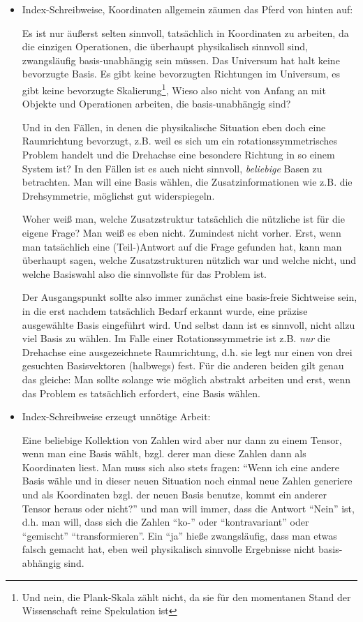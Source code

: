 \begin{remark}
\begin{itemize}
\item Index-Schreibweise, Koordinaten allgemein zäumen das Pferd von hinten auf:

Es ist nur äußerst selten sinnvoll, tatsächlich in Koordinaten zu arbeiten, da die einzigen Operationen, die überhaupt physikalisch sinnvoll sind, zwangsläufig basis-unabhängig sein müssen. Das Universum hat halt keine bevorzugte Basis. Es gibt keine bevorzugten Richtungen im Universum, es gibt keine bevorzugte Skalierung\footnote{Und nein, die Plank-Skala zählt nicht, da sie für den momentanen Stand der Wissenschaft reine Spekulation ist}, Wieso also nicht von Anfang an mit Objekte und Operationen arbeiten, die basis-unabhängig sind?

Und in den Fällen, in denen die physikalische Situation eben doch eine Raumrichtung bevorzugt, z.B. weil es sich um ein rotationssymmetrisches Problem handelt und die Drehachse eine besondere Richtung in so einem System ist? In den Fällen ist es auch nicht sinnvoll, \emph{beliebige} Basen zu betrachten. Man will eine Basis wählen, die Zusatzinformationen wie z.B. die Drehsymmetrie, möglichst gut widerspiegeln.

Woher weiß man, welche Zusatzstruktur tatsächlich die nützliche ist für die eigene Frage? Man weiß es eben nicht. Zumindest nicht vorher. Erst, wenn man tatsächlich eine (Teil-)Antwort auf die Frage gefunden hat, kann man überhaupt sagen, welche Zusatzstrukturen nützlich war und welche nicht, und welche Basiswahl also die sinnvollste für das Problem ist.

Der Ausgangspunkt sollte also immer zunächst eine basis-freie Sichtweise sein, in die erst nachdem tatsächlich Bedarf erkannt wurde, eine präzise ausgewählte Basis eingeführt wird. Und selbst dann ist es sinnvoll, nicht allzu viel Basis zu wählen. Im Falle einer Rotationssymmetrie ist z.B. \emph{nur} die Drehachse eine ausgezeichnete Raumrichtung, d.h. sie legt nur einen von drei gesuchten Basisvektoren (halbwegs) fest. Für die anderen beiden gilt genau das gleiche: Man sollte solange wie möglich abstrakt arbeiten und erst, wenn das Problem es tatsächlich erfordert, eine Basis wählen.

\item Index-Schreibweise erzeugt unnötige Arbeit:

Eine beliebige Kollektion von Zahlen wird aber nur dann zu einem Tensor, wenn man eine Basis wählt, bzgl. derer man diese Zahlen dann als Koordinaten liest. Man muss sich also stets fragen: \enquote{Wenn ich eine andere Basis wähle und in dieser neuen Situation noch einmal neue Zahlen generiere und als Koordinaten bzgl. der neuen Basis benutze, kommt ein anderer Tensor heraus oder nicht?} und man will immer, dass die Antwort \enquote{Nein} ist, d.h. man will, dass sich die Zahlen \enquote{ko-} oder \enquote{kontravariant} oder \enquote{gemischt} \enquote{transformieren}. Ein \enquote{ja} hieße zwangsläufig, dass man etwas falsch gemacht hat, eben weil physikalisch sinnvolle Ergebnisse nicht basis-abhängig sind.


\end{itemize}
\end{remark}
